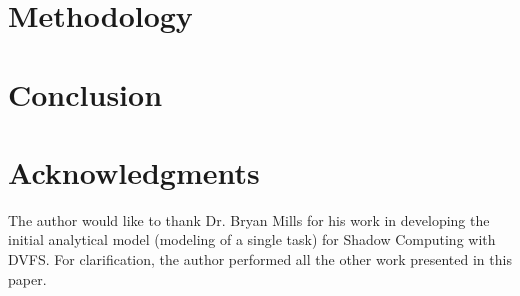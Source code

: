 \documentclass[11pt]{article}
\newcounter{lastnote}
\newenvironment{scilastnote}{%
\setcounter{lastnote}{\value{enumiv}}%
\addtocounter{lastnote}{+1}%
\begin{list}%
{\arabic{lastnote}.}
{\setlength{\leftmargin}{.22in}}
{\setlength{\labelsep}{.5em}}}
{\end{list}}
\begin{document}
\section{Methodology}
\label{sec:progress}


%

\section{Conclusion}
\label{sec:conclusion}


\section*{Acknowledgments}


The author would like to thank Dr. Bryan Mills for his work in developing the initial analytical model (modeling of a single task) for Shadow Computing with DVFS. For clarification, the author performed all the other work presented in this paper.












\end{document}
